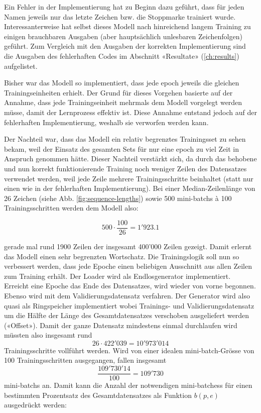 Ein Fehler in der Implementierung hat zu Beginn dazu geführt, dass für jeden Namen jeweils nur das letzte Zeichen bzw. die Stoppmarke trainiert wurde.
Interessanterweise hat selbst dieses Modell nach hinreichend langem Training zu einigen brauchbaren Ausgaben (aber hauptsächlich unlesbaren Zeichenfolgen) geführt.
Zum Vergleich mit den Ausgaben der korrekten Implementierung sind die Ausgaben des fehlerhaften Codes im Abschnitt «Resultate» (\ref{ch:results}) aufgelistet.

Bisher war das Modell so implementiert, dass jede \gls{epoch} jeweils die gleichen Trainingseinheiten erhielt.
Der Grund für dieses Vorgehen basierte auf der Annahme, dass jede Trainingseinheit mehrmals dem Modell vorgelegt werden müsse, damit der Lernprozess effektiv ist.
Diese Annahme entstand jedoch auf der fehlerhaften Implementierung, weshalb sie verworfen werden kann.

Der Nachteil war, dass das Modell ein relativ begrenztes Trainingsset zu sehen bekam, weil der Einsatz des gesamten Sets für nur eine \gls{epoch} zu viel Zeit in Anspruch genommen hätte.
Dieser Nachteil verstärkt sich, da durch das behobene und nun korrekt funktionierende Training noch weniger Zeilen des Datensatzes verwendet werden, weil jede Zeile mehrere Trainingsschritte beinhaltet (statt nur einen wie in der fehlerhaften Implementierung).
Bei einer Median-Zeilenlänge von 26 Zeichen (siehe Abb. \ref{fig:sequence-lengths}) sowie 500 \glspl{mini-batch} à 100 Trainingsschritten werden dem Modell also:

\[ 500 \cdot \frac{100}{26} = 1'923.1 \]

gerade mal rund 1900 Zeilen der insgesamt 400'000 Zeilen gezeigt.
Damit erlernt das Modell einen sehr begrenzten Wortschatz.
Die Trainingslogik soll nun so verbessert werden, dass jede Epoche einen beliebigen Ausschnitt aus allen Zeilen zum Training erhält.
Der Loader wird als Endlosgenerator implementiert.
Erreicht eine Epoche das Ende des Datensatzes, wird wieder von vorne begonnen.
Ebenso wird mit dem Validierungsdatensatz verfahren.
Der Generator wird also quasi als Ringspeicher implementiert wobei Trainings- und Validierungsdatensatz um die Hälfte der Länge des Gesamtdatensatzes
verschoben ausgeliefert werden («Offset»).
Damit der ganze Datensatz mindestens einmal durchlaufen wird müssten also insgesamt rund \[ 26 \cdot 422'039 = 10'973'014 \] Trainingsschritte vollführt werden.
Wird von einer idealen \gls{mini-batch}-Grösse von 100 Trainingsschritten ausgegangen, fallen insgesamt \[ \frac{109'730'14}{100} = 109'730 \] \glspl{mini-batch} an.
Damit kann die Anzahl der notwendigen \glspl{mini-batches} für einen bestimmten Prozentsatz des Gesamtdatensatzes als Funktion $ b(p, e) $ ausgedrückt werden:


